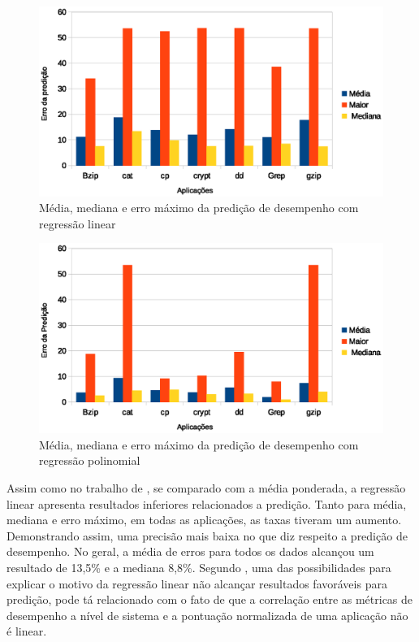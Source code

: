 \documentclass[[10pt,journal]{IEEEtran}
\begin{document}
\begin{figure}[!htb]
\centering
\includegraphics[width=.5\textwidth]{graficos/linear_error.eps}
\caption{Média, mediana e erro máximo da predição de desempenho com regressão linear}
\label{linear_error}
\end{figure}  

\begin{figure}[!htb]
\centering
\includegraphics[width=.5\textwidth]{graficos/polinomial_error.eps}
\caption{Média, mediana e erro máximo da predição de desempenho com regressão polinomial}
\label{polinomial_error}
\end{figure}  


Assim como no trabalho de \cite{koh2007}, se comparado com a média ponderada, a regressão linear apresenta resultados inferiores relacionados a predição. Tanto para média, mediana e erro máximo, em todas as aplicações, as taxas tiveram um aumento. Demonstrando assim, uma precisão mais baixa no que diz respeito a predição de desempenho. No geral, a média de erros para todos os dados alcançou um resultado de 13,5\% e a mediana 8,8\%. Segundo \cite{koh2007}, uma das possibilidades para explicar o motivo da regressão linear não alcançar resultados favoráveis para predição, pode tá relacionado com o fato de que a correlação entre as métricas de desempenho a nível de sistema e a pontuação normalizada de uma aplicação não é linear. 
\end{document}
